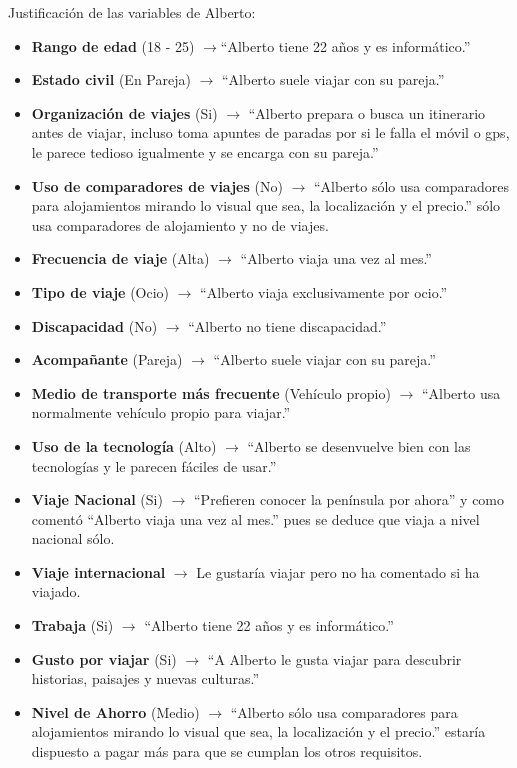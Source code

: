\noindent Justificación de las variables de Alberto:
\begin{itemize}
    \item \textbf{Rango de edad} (18 - 25) $\rightarrow$“Alberto tiene 22 años y es informático.”
    \item \textbf{Estado civil} (En Pareja) $\rightarrow$ “Alberto suele viajar con su pareja.”
    \item \textbf{Organización de viajes} (Si) $\rightarrow$ “Alberto prepara o busca un itinerario antes de viajar, incluso toma apuntes de paradas por si le falla el móvil o gps, le parece tedioso igualmente y se encarga con su pareja.”
    \item \textbf{Uso de comparadores de viajes} (No) $\rightarrow$ “Alberto sólo usa comparadores para alojamientos mirando lo visual que sea, la localización y el precio.” sólo usa comparadores de alojamiento y no de viajes.
    \item \textbf{Frecuencia de viaje} (Alta) $\rightarrow$ “Alberto viaja una vez al mes.”
    \item \textbf{Tipo de viaje} (Ocio) $\rightarrow$ “Alberto viaja exclusivamente por ocio.”
    \item \textbf{Discapacidad} (No) $\rightarrow$ “Alberto no tiene discapacidad.”
    \item \textbf{Acompañante} (Pareja) $\rightarrow$ “Alberto suele viajar con su pareja.”
    \item \textbf{Medio de transporte más frecuente} (Vehículo propio) $\rightarrow$ “Alberto usa normalmente vehículo propio para viajar.”
    \item \textbf{Uso de la tecnología} (Alto) $\rightarrow$ “Alberto se desenvuelve bien con las tecnologías y le parecen fáciles de usar.”
    \item \textbf{Viaje Nacional} (Si) $\rightarrow$ “Prefieren conocer la península por ahora” y como comentó “Alberto viaja una vez al mes.” pues se deduce que viaja a nivel nacional sólo.
    \item \textbf{Viaje internacional} $\rightarrow$ Le gustaría viajar pero no ha comentado si ha viajado.
    \item \textbf{Trabaja} (Si) $\rightarrow$ “Alberto tiene 22 años y es informático.”
    \item \textbf{Gusto por viajar} (Si) $\rightarrow$ “A Alberto le gusta viajar para descubrir historias, paisajes y nuevas culturas.”
    \item \textbf{Nivel de Ahorro} (Medio) $\rightarrow$ “Alberto sólo usa comparadores para alojamientos mirando lo visual que sea, la localización y el precio.” estaría dispuesto a pagar más para que se cumplan los otros requisitos.
\end{itemize}

